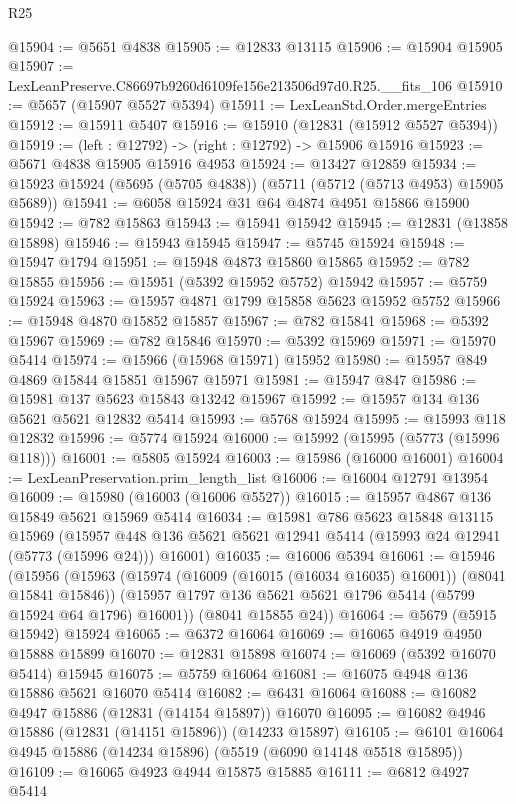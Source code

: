 \begin{lexlean}{R25}
\begin{coremodule}
@15904 := @5651 @4838
@15905 := @12833 @13115
@15906 := @15904 @15905
@15907 := LexLeanPreserve.C86697b9260d6109fe156e213506d97d0.R25.__fits_106
@15910 := @5657 (@15907 @5527 @5394)
@15911 := LexLeanStd.Order.mergeEntries
@15912 := @15911 @5407
@15916 := @15910 (@12831 (@15912 @5527 @5394))
@15919 := (left : @12792) -> (right : @12792) -> @15906 @15916
@15923 := @5671 @4838 @15905 @15916 @4953
@15924 := @13427 @12859
@15934 := @15923 @15924 (@5695 (@5705 @4838)) (@5711 (@5712 (@5713 @4953) @15905 @5689))
@15941 := @6058 @15924 @31 @64 @4874 @4951 @15866 @15900
@15942 := @782 @15863
@15943 := @15941 @15942
@15945 := @12831 (@13858 @15898)
@15946 := @15943 @15945
@15947 := @5745 @15924
@15948 := @15947 @1794
@15951 := @15948 @4873 @15860 @15865
@15952 := @782 @15855
@15956 := @15951 (@5392 @15952 @5752) @15942
@15957 := @5759 @15924
@15963 := @15957 @4871 @1799 @15858 @5623 @15952 @5752
@15966 := @15948 @4870 @15852 @15857
@15967 := @782 @15841
@15968 := @5392 @15967
@15969 := @782 @15846
@15970 := @5392 @15969
@15971 := @15970 @5414
@15974 := @15966 (@15968 @15971) @15952
@15980 := @15957 @849 @4869 @15844 @15851 @15967 @15971
@15981 := @15947 @847
@15986 := @15981 @137 @5623 @15843 @13242 @15967
@15992 := @15957 @134 @136 @5621 @5621 @12832 @5414
@15993 := @5768 @15924
@15995 := @15993 @118 @12832
@15996 := @5774 @15924
@16000 := @15992 (@15995 (@5773 (@15996 @118)))
@16001 := @5805 @15924
@16003 := @15986 (@16000 @16001)
@16004 := LexLeanPreservation.prim_length_list
@16006 := @16004 @12791 @13954
@16009 := @15980 (@16003 (@16006 @5527))
@16015 := @15957 @4867 @136 @15849 @5621 @15969 @5414
@16034 := @15981
    @786
    @5623
    @15848
    @13115
    @15969
    (@15957 @448 @136 @5621 @5621 @12941 @5414 (@15993 @24 @12941 (@5773 (@15996 @24))) @16001)
@16035 := @16006 @5394
@16061 := @15946
    (@15956
      (@15963
        (@15974 (@16009 (@16015 (@16034 @16035) @16001)) (@8041 @15841 @15846))
        (@15957 @1797 @136 @5621 @5621 @1796 @5414 (@5799 @15924 @64 @1796) @16001))
      (@8041 @15855 @24))
@16064 := @5679 (@5915 @15942) @15924
@16065 := @6372 @16064
@16069 := @16065 @4919 @4950 @15888 @15899
@16070 := @12831 @15898
@16074 := @16069 (@5392 @16070 @5414) @15945
@16075 := @5759 @16064
@16081 := @16075 @4948 @136 @15886 @5621 @16070 @5414
@16082 := @6431 @16064
@16088 := @16082 @4947 @15886 (@12831 (@14154 @15897)) @16070
@16095 := @16082 @4946 @15886 (@12831 (@14151 @15896)) (@14233 @15897)
@16105 := @6101 @16064 @4945 @15886 (@14234 @15896) (@5519 (@6090 @14148 @5518 @15895))
@16109 := @16065 @4923 @4944 @15875 @15885
@16111 := @6812 @4927 @5414

\end{coremodule}
\end{lexlean}
